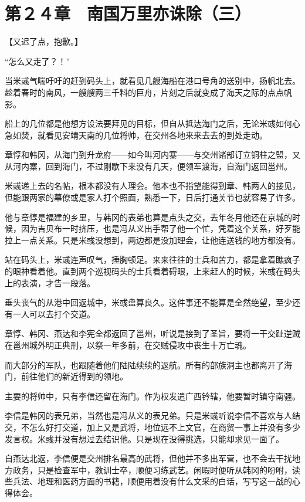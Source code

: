 \section{第２４章　南国万里亦诛除（三）}

【又迟了点，抱歉。】

“怎么又走了？！”

当米彧气喘吁吁的赶到码头上，就看见几艘海船在港口号角的送别中，扬帆北去。趁着春时的南风，一艘艘两三千料的巨舟，片刻之后就变成了海天之际的点点帆影。

船上的几位都是他想方设法要拜见的目标，但自从抵达海门之后，无论米彧如何心急如焚，就看见安靖天南的几位将帅，在交州各地来来去去的到处走动。

章惇和韩冈，从海门到升龙府——如今叫河内寨——与交州诸部订立铜柱之盟，又从河内寨，回到海门，不过刚歇下来没有几天，便领军渡海，自海门返回邕州。

米彧递上去的名帖，根本都没有人理会。他本也不指望能得到章、韩两人的接见，但能跟两家的幕僚或是家人打个照面，熟悉一下，日后打通关节也就容易了许多。

他与章惇是福建的乡里，与韩冈的表弟也算是点头之交，去年冬月他还在京城的时候，因为吉贝布一时挤压，也是冯从义出手帮了他一个忙，凭着这个关系，好歹能拉上一点关系。只是米彧没想到，两边都是没加理会，让他连送钱的地方都没有。

站在码头上，米彧连声叹气，捶胸顿足。来来往往的士兵和苦力，都是拿着瞧疯子的眼神看着他。直到两个巡视码头的士兵看着碍眼，上来赶人的时候，米彧在码头上的表演，才告一段落。

垂头丧气的从港中回返城中，米彧盘算良久。这件事还不能算是全然绝望，至少还有一人可以去打个交道。

章惇、韩冈、燕达和李宪全都返回了邕州，听说是接到了圣旨，要将一干交趾逆贼在邕州城外明正典刑，以祭一年多前，在交贼侵攻中丧生十万亡魂。

而大部分的军队，也跟随着他们陆陆续续的返航。所有的部族洞主也都离开了海门，前往他们的新近得到的领地。

主要的将帅中，只有李信还留在海门。作为权发遣广西钤辖，他要暂时镇守南疆。

李信是韩冈的表兄弟，当然也是冯从义的表兄弟。只是米彧听说李信不喜欢与人结交，不怎么好打交道，加上又是武将，地位远不上文官，在商贸一事上并没有多少发言权。米彧并没有想过去结识他。只是现在没得挑选，只能却求见一面了。

自燕达北返，李信便是交州排名最高的武将，但他并不多出军营，也不会去干扰地方政务，只是检查军中，教训士卒，顺便习练武艺。闲暇时便听从韩冈的吩咐，读些兵法、地理和医药方面的书籍，顺便用着没有什么文采的白话，写写这一战的心得体会。

